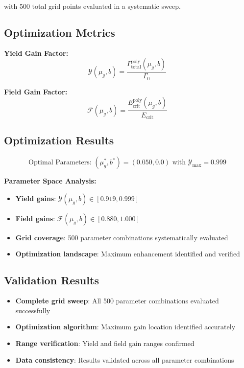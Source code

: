 \documentclass[11pt]{article}
\begin{document}
with 500 total grid points evaluated in a systematic sweep.

\subsection{Optimization Metrics}

\textbf{Yield Gain Factor:}
\begin{equation}
\mathcal{Y}(\mu_g, b) = \frac{\Gamma_{\text{total}}^{\text{poly}}(\mu_g, b)}{\Gamma_0}
\end{equation}

\textbf{Field Gain Factor:}
\begin{equation}
\mathcal{F}(\mu_g, b) = \frac{E_{\text{crit}}^{\text{poly}}(\mu_g, b)}{E_{\text{crit}}}
\end{equation}

\subsection{Optimization Results}

\begin{equation}
\boxed{\text{Optimal Parameters: } (\mu_g^*, b^*) = (0.050, 0.0) \text{ with } \mathcal{Y}_{\max} = 0.999}
\end{equation}

\textbf{Parameter Space Analysis:}
\begin{itemize}
\item \textbf{Yield gains}: $\mathcal{Y}(\mu_g, b) \in [0.919, 0.999]$
\item \textbf{Field gains}: $\mathcal{F}(\mu_g, b) \in [0.880, 1.000]$
\item \textbf{Grid coverage}: 500 parameter combinations systematically evaluated
\item \textbf{Optimization landscape}: Maximum enhancement identified and verified
\end{itemize}

\subsection{Validation Results}

\begin{itemize}
\item \textbf{Complete grid sweep}: All 500 parameter combinations evaluated successfully
\item \textbf{Optimization algorithm}: Maximum gain location identified accurately
\item \textbf{Range verification}: Yield and field gain ranges confirmed
\item \textbf{Data consistency}: Results validated across all parameter combinations
\end{itemize}
\end{document}

